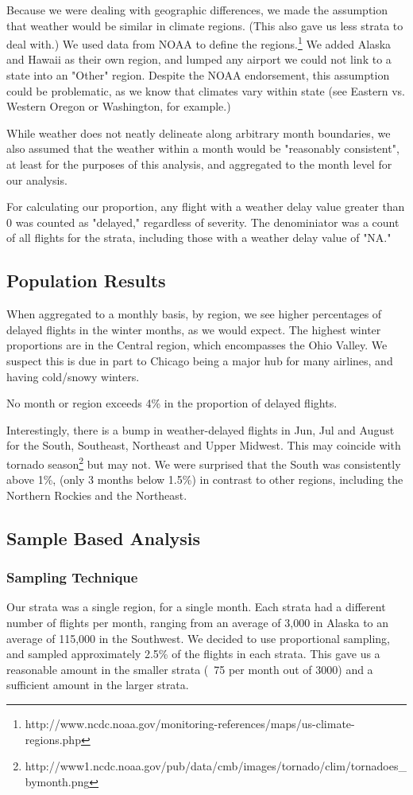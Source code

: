 \documentclass{article}
\begin{document}
Because we were dealing with geographic differences, we made the assumption that weather would be similar in climate regions. (This also gave us less strata to deal with.) We used data from NOAA to define the regions.\footnote{http://www.ncdc.noaa.gov/monitoring-references/maps/us-climate-regions.php} We added Alaska and Hawaii as their own region, and lumped any airport we could not link to a state into an "Other" region. Despite the NOAA endorsement, this assumption could be problematic, as we know that climates vary within state (see Eastern vs. Western Oregon or Washington, for example.) 

While weather does not neatly delineate along arbitrary month boundaries, we also assumed that the weather within a month would be "reasonably consistent", at least for the purposes of this analysis, and aggregated to the month level for our analysis.

For calculating our proportion, any flight with a weather delay value greater than 0 was counted as "delayed," regardless of severity. The denominiator was a count of all flights for the strata, including those with a weather delay value of "NA." 

\subsection{Population Results}
When aggregated to a monthly basis, by region, we see higher percentages of delayed flights in the winter months, as we would expect. The highest winter proportions are in the Central region, which encompasses the Ohio Valley. We suspect this is due in part to Chicago being a major hub for many airlines, and having cold/snowy winters.

No month or region exceeds 4\% in the proportion of delayed flights.

Interestingly, there is a bump in weather-delayed flights in Jun, Jul and August for the South, Southeast, Northeast and Upper Midwest. This may coincide with tornado season\footnote{http://www1.ncdc.noaa.gov/pub/data/cmb/images/tornado/clim/tornadoes_bymonth.png} but may not. We were surprised that the South was consistently above 1\%, (only 3 months below 1.5\%) in contrast to other regions, including the Northern Rockies and the Northeast.


\subsection{Sample Based Analysis}
\subsubsection{Sampling Technique}
Our strata was a single region, for a single month. Each strata had a different number of flights per month, ranging from an average of 3,000 in Alaska to an average of 115,000 in the Southwest. We decided to use proportional sampling, and sampled approximately 2.5\% of the flights in each strata. This gave us a reasonable amount in the smaller strata (~75 per month out of 3000) and a sufficient amount in the larger strata. 
\end{document}
